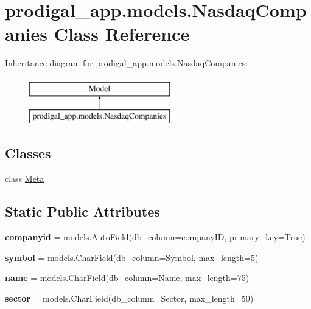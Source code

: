 \hypertarget{classprodigal__app_1_1models_1_1_nasdaq_companies}{}\section{prodigal\+\_\+app.\+models.\+Nasdaq\+Companies Class Reference}
\label{classprodigal__app_1_1models_1_1_nasdaq_companies}
Inheritance diagram for prodigal\+\_\+app.\+models.\+Nasdaq\+Companies\+:\begin{figure}[H]
\begin{center}
\leavevmode
\includegraphics[height=2.000000cm]{classprodigal__app_1_1models_1_1_nasdaq_companies}
\end{center}
\end{figure}
\subsection*{Classes}
\begin{DoxyCompactItemize}
\item 
class \mbox{\hyperlink{classprodigal__app_1_1models_1_1_nasdaq_companies_1_1_meta}{Meta}}
\end{DoxyCompactItemize}
\subsection*{Static Public Attributes}
\begin{DoxyCompactItemize}
\item 
\mbox{\label{classprodigal__app_1_1models_1_1_nasdaq_companies_aec2ef0c8326fb4b3ed6bb4aab13bc3da}} 
{\bfseries companyid} = models.\+Auto\+Field(db\+\_\+column=\textquotesingle{}company\+ID\textquotesingle{}, primary\+\_\+key=True)
\item 
\mbox{\label{classprodigal__app_1_1models_1_1_nasdaq_companies_a09c650398eb2bfe3407fdfc8d1f4ce28}} 
{\bfseries symbol} = models.\+Char\+Field(db\+\_\+column=\textquotesingle{}Symbol\textquotesingle{}, max\+\_\+length=5)
\item 
\mbox{\label{classprodigal__app_1_1models_1_1_nasdaq_companies_ab591b6719b68e487f17576ba485aeaa3}} 
{\bfseries name} = models.\+Char\+Field(db\+\_\+column=\textquotesingle{}Name\textquotesingle{}, max\+\_\+length=75)
\item 
\mbox{\label{classprodigal__app_1_1models_1_1_nasdaq_companies_a8549cb43e7735487903415c66ec6e66c}} 
{\bfseries sector} = models.\+Char\+Field(db\+\_\+column=\textquotesingle{}Sector\textquotesingle{}, max\+\_\+length=50)
\end{DoxyCompactItemize}


